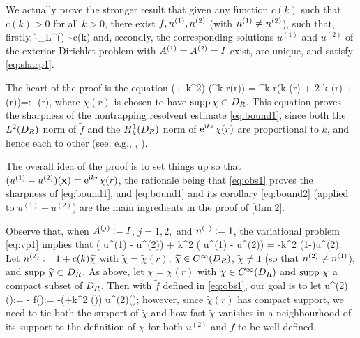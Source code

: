 We actually prove the stronger result that given any function $c(k)$ such that $c(k)>0$ for all $k>0$, there exist 
$f, {n}^{(1)}, {n}^{(2)}$ (with ${n}^{(1)}\not= {n}^{(2)}$), such that, firstly,
\beqs
\big\|\nso-\nst\big\|_{L^\infty(\DR)} \sim c(k)
\eeqs
and, secondly,
the corresponding solutions $u^{(1)}$ and $u^{(2)}$ of the exterior Dirichlet problem with ${A}^{(1)} = {A}^{(2)}= I$ exist, are unique, and satisfy \cref{eq:sharp1}. 

The heart of the proof is the equation
\beq\label{eq:obs1}
(\Delta + k^2) \big(\re^{\ri k r}\chi(r)\big) =  \re^{\ri k r}\left(\ri k  \chi(r) + 2 \ri k (r) + \Delta \chi(r)\right)=: -(r),
\eeq
where $\chi(r)$ is chosen to have $\operatorname{supp} \chi \subset D_{R}$.
This equation proves the sharpness of the nontrapping resolvent estimate \cref{eq:bound1}, since both the $L^2(D_{R})$ norm of $\widetilde{f}$ and the $\HokDR$ norm of $\mathrm{e}^{\mathrm{i} kr}\chi(r)$ are proportional to $k$, and hence each to other (see, e.g., \cite[Lemma 3.10]{ChMo:08},  \cite[Lemma 4.12]{Sp:14}).

The overall idea of the proof is to set things up so that $(u^{(1)}-u^{(2)})(\mathbf{x}) = \mathrm{e}^{\mathrm{i} k r}\chi(r)$, the rationale being that \cref{eq:obs1} proves the sharpness of \cref{eq:bound1}, and \cref{eq:bound1} and its corollary \cref{eq:bound2} (applied to $u^{(1)}-u^{(2)}$) are the main ingredients in the proof of \cref{thm:2}.

Observe that, when $A^{(j)}:=I$, $j=1,2,$ and ${n}^{(1)}:=1$, the variational problem \cref{eq:vp1} implies that 
\beq\label{eq:obs2}
\Delta \big( u^{(1)} - u^{(2)}\big) + k^2 \big( u^{(1)} - u^{(2)}\big) = -k^2 \big(1-\nst\big)u^{(2)}.
\eeq
Let ${n}^{(2)}:= 1 + c(k)\widetilde{\chi}$ with $\widetilde{\chi}= \widetilde{\chi}(r)$, $\widetilde{\chi}\in C^{\infty}(D_{R})$, $\widetilde{\chi}\not = 1$ (so that ${n}^{(2)}\not = {n}^{(1)}$), and 
 $\operatorname{supp} \, \widetilde{\chi} \subset D_{R}$. 
As above, let $\chi=\chi(r)$ with $\chi \in C^{\infty}(D_{R})$ and
$\operatorname{supp} \,\chi$ a compact subset of $D_{R}$. Then with $\widetilde{f}$ defined in \cref{eq:obs1}, our goal is to let 
\beq\label{eq:obs3}
u^{(2)}(\bx):= - \quad\tand\quad  f(\bx):= -\big(\Delta +k^2 \nst(\bx)\big) u^{(2)}(\bx);
\eeq
however, since $\widetilde{\chi}(r)$ has compact support, we need to tie both the support of $\widetilde{\chi}$ and how fast $\widetilde{\chi}$ vanishes in a neighbourhood of its support to the definition of $\chi$ for both $u^{(2)}$ and $f$ to be well defined.

